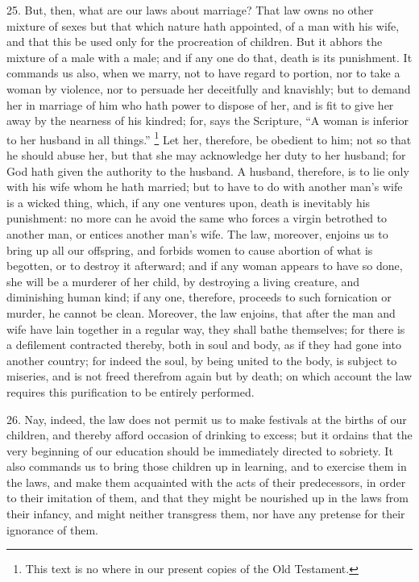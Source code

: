 25. But, then, what are our laws about marriage? That law owns no other
mixture of sexes but that which nature hath appointed, of a man with his
wife, and that this be used only for the procreation of children. But it
abhors the mixture of a male with a male; and if any one do that, death is
its punishment. It commands us also, when we marry, not to have regard to
portion, nor to take a woman by violence, nor to persuade her deceitfully
and knavishly; but to demand her in marriage of him who hath power to
dispose of her, and is fit to give her away by the nearness of his
kindred; for, says the Scripture, ``A woman is inferior to her husband in
all things.'' \footnote{This text is no where in
our present copies of the Old Testament.} Let her, therefore, be obedient
to him; not so that he should abuse her, but that she may acknowledge her
duty to her husband; for God hath given the authority to the husband. A
husband, therefore, is to lie only with his wife whom he hath married; but
to have to do with another man's wife is a wicked thing, which, if any one
ventures upon, death is inevitably his punishment: no more can he avoid
the same who forces a virgin betrothed to another man, or entices another
man's wife. The law, moreover, enjoins us to bring up all our offspring,
and forbids women to cause abortion of what is begotten, or to destroy it
afterward; and if any woman appears to have so done, she will be a
murderer of her child, by destroying a living creature, and diminishing
human kind; if any one, therefore, proceeds to such fornication or murder,
he cannot be clean. Moreover, the law enjoins, that after the man and wife
have lain together in a regular way, they shall bathe themselves; for
there is a defilement contracted thereby, both in soul and body, as if
they had gone into another country; for indeed the soul, by being united
to the body, is subject to miseries, and is not freed therefrom again but
by death; on which account the law requires this purification to be
entirely performed.

26. Nay, indeed, the law does not permit us to make festivals at the
births of our children, and thereby afford occasion of drinking to excess;
but it ordains that the very beginning of our education should be
immediately directed to sobriety. It also commands us to bring those
children up in learning, and to exercise them in the laws, and make them
acquainted with the acts of their predecessors, in order to their
imitation of them, and that they might be nourished up in the laws from
their infancy, and might neither transgress them, nor have any pretense
for their ignorance of them.

